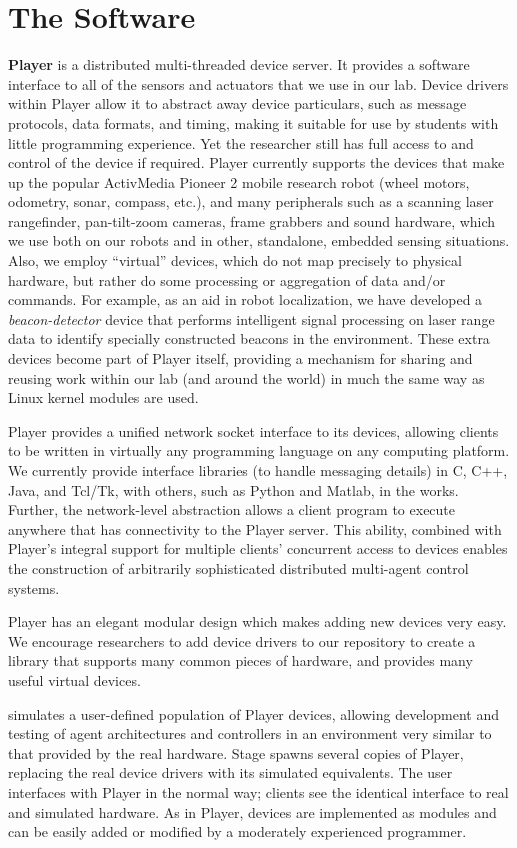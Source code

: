 \documentclass[10pt]{article}
\begin{document}
\section*{The Software}
{\bf Player} is a distributed multi-threaded device server.  It provides a
software interface to all of the sensors and actuators that we use in
our lab.  Device drivers within Player allow it to abstract away
device particulars, such as message protocols, data formats, and
timing, making it suitable for use by students with little programming
experience. Yet the researcher still has full access to and control of
the device if required. Player currently supports the devices that
make up the popular ActivMedia Pioneer 2 mobile research robot (wheel
motors, odometry, sonar, compass, etc.), and many peripherals such as
a scanning laser rangefinder, pan-tilt-zoom cameras, frame grabbers
and sound hardware, which we use both on our robots and in other,
standalone, embedded sensing situations.  Also, we employ ``virtual''
devices, which do not map precisely to physical hardware, but rather
do some processing or aggregation of data and/or commands.  For
example, as an aid in robot localization, we have developed a {\sl
  beacon-detector} device that performs intelligent signal processing
on laser range data to identify specially constructed beacons in the
environment.  These extra devices become part of Player itself,
providing a mechanism for sharing and reusing work within our lab (and
around the world) in much the same way as Linux kernel modules are
used.

Player provides a unified network socket interface to its devices, allowing
clients to be written in virtually any programming language on 
any computing platform.  We currently provide interface libraries
(to handle messaging details) in C, C++, Java, and Tcl/Tk, with
others, such as Python and Matlab, in the works.  Further, the
network-level abstraction allows a client program to execute
anywhere that has connectivity to the Player server.
This ability, combined with Player's integral support for multiple
clients' concurrent access to devices enables the construction
of arbitrarily sophisticated distributed multi-agent control
systems.

Player has an elegant modular design which makes adding new devices
very easy. We encourage researchers to add device drivers to our
repository to create a library that supports many common pieces of
hardware, and provides many useful virtual devices.

 simulates a user-defined population of Player devices, allowing
development and testing of agent architectures and controllers in an
environment very similar to that provided by the real hardware. Stage
spawns several copies of Player, replacing the real device drivers
with its simulated equivalents. The user interfaces with Player in the
normal way; clients see the identical interface to real and simulated
hardware. As in Player, devices are implemented as modules and can be
easily added or modified by a moderately experienced programmer.
\end{document}
